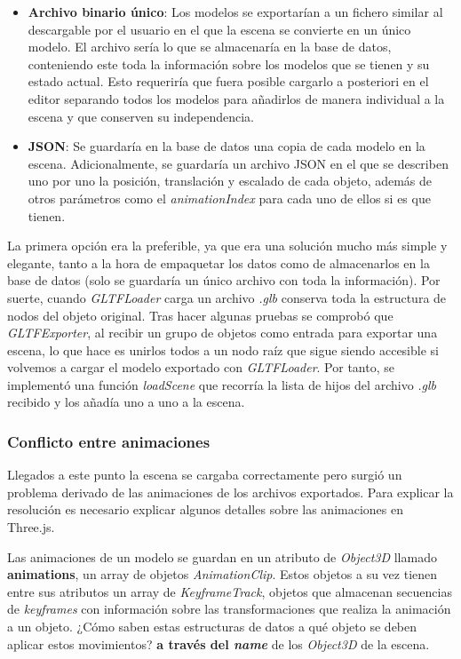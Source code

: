 \begin{itemize}
    \item \textbf{Archivo binario único}: Los modelos se exportarían a un fichero similar al descargable por el usuario en el que la escena se convierte en un único modelo. El archivo sería lo que se almacenaría en la base de datos, conteniendo este toda la información sobre los modelos que se tienen y su estado actual. Esto requeriría que fuera posible cargarlo a posteriori en el editor separando todos los modelos para añadirlos de manera individual a la escena y que conserven su independencia.
    
    \item \textbf{JSON}: Se guardaría en la base de datos una copia de cada modelo en la escena. Adicionalmente, se guardaría un archivo JSON en el que se describen uno por uno la posición, translación y escalado de cada objeto, además de otros parámetros como el \textit{animationIndex} para cada uno de ellos si es que tienen.
\end{itemize}

La primera opción era la preferible, ya que era una solución mucho más simple y elegante, tanto a la hora de empaquetar los datos como de almacenarlos en la base de datos (solo se guardaría un único archivo con toda la información). Por suerte, cuando \textit{GLTFLoader} carga un archivo \textit{.glb} conserva toda la estructura de nodos del objeto original. Tras hacer algunas pruebas se comprobó que \textit{GLTFExporter}, al recibir un grupo de objetos como entrada para exportar una escena, lo que hace es unirlos todos a un nodo raíz que sigue siendo accesible si volvemos a cargar el modelo exportado con \textit{GLTFLoader}. Por tanto, se implementó una función \textit{loadScene} que recorría la lista de hijos del archivo \textit{.glb} recibido y los añadía uno a uno a la escena. 

\subsubsection{Conflicto entre animaciones}

Llegados a este punto la escena se cargaba correctamente pero surgió un problema derivado de las animaciones de los archivos exportados. Para explicar la resolución es necesario explicar algunos detalles sobre las animaciones en Three.js.

Las animaciones de un modelo se guardan en un atributo de \textit{Object3D} llamado \textbf{animations}, un array de objetos \textit{AnimationClip}. Estos objetos a su vez tienen entre sus atributos un array de \textit{KeyframeTrack}, objetos que almacenan secuencias de \textit{keyframes} con información sobre las transformaciones que realiza la animación a un objeto. ¿Cómo saben estas estructuras de datos a qué objeto se deben aplicar estos movimientos? \textbf{a través del \textit{name}} de los \textit{Object3D} de la escena.

